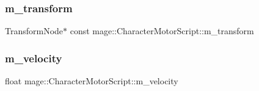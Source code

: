 \subsubsection{\texorpdfstring{m\+\_\+transform}{m\_transform}}
{\footnotesize\ttfamily Transform\+Node$\ast$ const mage\+::\+Character\+Motor\+Script\+::m\+\_\+transform\hspace{0.3cm}{\ttfamily [private]}}

\hypertarget{classmage_1_1_character_motor_script_a02441cc4c84ba12811845b7f966f4069}{}\label{classmage_1_1_character_motor_script_a02441cc4c84ba12811845b7f966f4069} 
\subsubsection{\texorpdfstring{m\+\_\+velocity}{m\_velocity}}
{\footnotesize\ttfamily float mage\+::\+Character\+Motor\+Script\+::m\+\_\+velocity\hspace{0.3cm}{\ttfamily [private]}}

